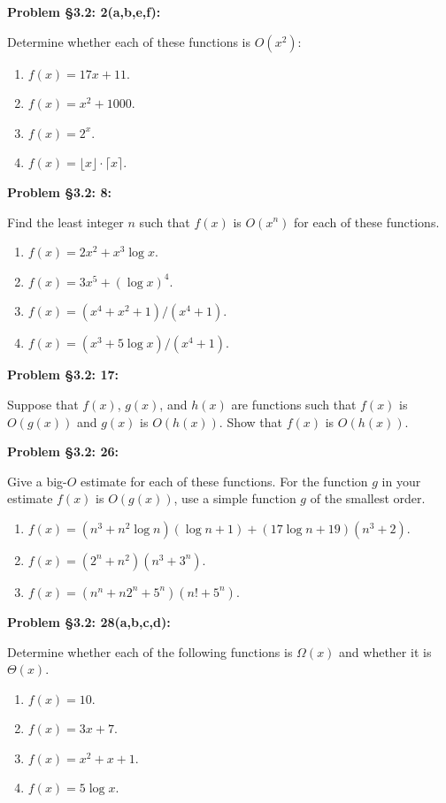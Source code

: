 \documentclass{article}
\newenvironment{problem}[1]
    {\begin{mdframed}[default]
    \textbf{Problem #1:}
    }
    {\end{mdframed}
    }
\begin{document}
\begin{problem}{\S 3.2: 2(a,b,e,f)}
Determine whether each of these functions is $O(x^2)$:
\begin{enumerate}
    \item[(a)] $f(x) = 17x + 11$.
    \item[(b)] $f(x) = x^2 + 1000$.
    \item[(e)] $f(x) = 2^x$.
    \item[(f)] $f(x) = \lfloor x \rfloor \cdot \lceil x \rceil$.
\end{enumerate}
\end{problem}

\begin{problem}{\S 3.2: 8}
Find the least integer $n$ such that $f(x)$ is $O(x^n)$ for each of these functions.
\begin{enumerate}
    \item[(a)] $f(x) = 2x^2 + x^3\log{x}$.
    \item[(b)] $f(x) = 3x^5 + (\log{x})^4$.
    \item[(c)] $f(x) = (x^4+x^2+1)/(x^4+1)$.
    \item[(d)] $f(x) = (x^3+5\log{x})/(x^4+1)$.
\end{enumerate}
\end{problem}

\begin{problem}{\S 3.2: 17}
Suppose that $f(x)$, $g(x)$, and $h(x)$ are functions such that $f(x)$ is $O(g(x))$ and $g(x)$ is $O(h(x))$. Show that $f(x)$ is $O(h(x))$.
\end{problem}

\begin{problem}{\S 3.2: 26}
Give a big-$O$ estimate for each of these functions. For the function $g$ in your estimate $f(x)$ is $O(g(x))$, use a simple function $g$ of the smallest order.
\begin{enumerate}
    \item[(a)] $f(x) = (n^3+n^2\log{n})(\log{n}+1) + (17\log{n} + 19)(n^3+2)$.
    \item[(b)] $f(x) = (2^n + n^2)(n^3 + 3^n)$.
    \item[(c)] $f(x) = (n^n + n2^n + 5^n)(n!+5^n)$.
\end{enumerate}
\end{problem}

\begin{problem}{\S 3.2: 28(a,b,c,d)}
Determine whether each of the following functions is $\Omega(x)$ and whether it is $\Theta(x)$.
\begin{enumerate}
    \item[(a)] $f(x) = 10$.
    \item[(b)] $f(x) = 3x+7$.
    \item[(c)] $f(x) = x^2 + x + 1$.
    \item[(d)] $f(x) = 5\log{x}$.
\end{enumerate}
\end{problem}
\end{document}
